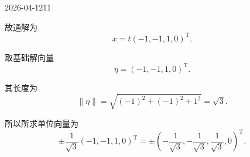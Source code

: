 \begin{mistake}{2026-04-12}{11}
\begin{solutioncontent}
故通解为
\[
x=t(-1,-1,1,0)^{\mathrm T}.
\]

取基础解向量
\[
\eta=(-1,-1,1,0)^{\mathrm T}.
\]

其长度为
\[
\|\eta\|=\sqrt{(-1)^2+(-1)^2+1^2}=\sqrt{3}.
\]

所以所求单位向量为
\[
\pm\frac{1}{\sqrt{3}}(-1,-1,1,0)^{\mathrm T}
=
\pm\left(-\frac{1}{\sqrt{3}},-\frac{1}{\sqrt{3}},\frac{1}{\sqrt{3}},0\right)^{\mathrm T}.
\]

\end{solutioncontent}


\end{mistake}
